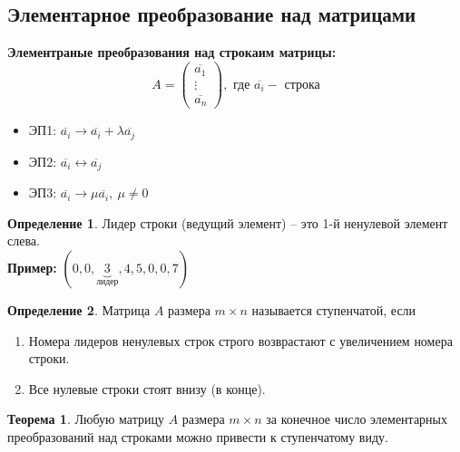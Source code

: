 \documentclass[a4paper, 12pt]{article}
\theoremstyle{definition}
\newtheorem*{definition}{Определение}
\newtheorem*{theorem}{Теорема}
\begin{document}
    \subsection{Элементарное преобразование над матрицами}
    \textbf{Элементраные преобразования над строкаим матрицы:}
    $$A = \begin{pmatrix}
        \overline{a_1}\\\vdots\\\overline{a_n}
    \end{pmatrix},\text{ где } \overline{a_i} - \text{ строка}$$
    \begin{itemize}
        \item ЭП1: $\overline{a_i} \to \overline{a_i} + \lambda\overline{a_j}$
        \item ЭП2: $\overline{a_i} \longleftrightarrow \overline{a_j}$ 
        \item ЭП3: $\overline{a_i} \to \mu \overline{a_i},\ \mu \neq 0$ 
    \end{itemize}
    \begin{definition}
        Лидер строки (ведущий элемент) -- это 1-й ненулевой элемент слева.\\
        \textbf{Пример:}
        $(0, 0, \underbrace{3}_{\text{лидер}}, 4, 5, 0, 0, 7)$ 
    \end{definition}
    \begin{definition}
        Матрица $A$ размера $m\times n$ называется ступенчатой, если
        \begin{enumerate}
            \item Номера лидеров ненулевых строк строго возврастают с увеличением номера строки.
            \item Все нулевые строки стоят внизу (в конце).
        \end{enumerate}
    \end{definition}
    \begin{theorem}
        Любую матрицу $A$ размера $m\times n$ за конечное число элементарных преобразований над строками можно привести к ступенчатому виду.
    \end{theorem}
\end{document}
